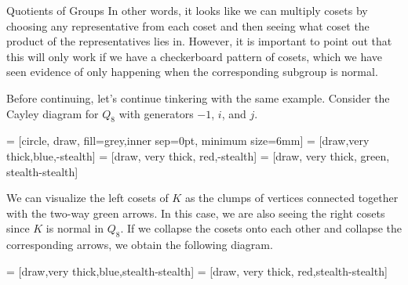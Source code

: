 \begin{section}{Quotients of Groups}
In other words, it looks like we can multiply cosets by choosing any representative from each coset and then seeing what coset the product of the representatives lies in.  However, it is important to point out that this will only work if we have a checkerboard pattern of cosets, which we have seen evidence of only happening when the corresponding subgroup is normal.

Before continuing, let's continue tinkering with the same example.  Consider the Cayley diagram for \(Q_8\) with generators \(-1\), \(i\), and \(j\).

 = [circle, draw, fill=grey,inner sep=0pt, minimum size=6mm]
 = [draw,very thick,blue,-stealth]
 = [draw, very thick, red,-stealth]
 = [draw, very thick, green, stealth-stealth]

\begin{center}
\end{center}
We can visualize the left cosets of \(K\) as the clumps of vertices connected together with the two-way green arrows.  In this case, we are also seeing the right cosets since \(K\) is normal in \(Q_8\).  If we collapse the cosets onto each other and collapse the corresponding arrows, we obtain the following diagram.

 = [draw,very thick,blue,stealth-stealth]
 = [draw, very thick, red,stealth-stealth]


\end{section}
